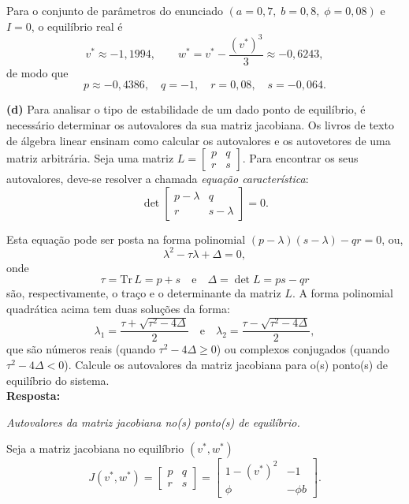 \documentclass[english,11pt,a4paper]{article}
\begin{document}
	\noindent Para o conjunto de parâmetros do enunciado \((a=0{,}7,\; b=0{,}8,\; \phi=0{,}08)\) e \(I=0\), o equilíbrio real é
	\[
	v^\ast \approx -1{,}1994,\qquad w^\ast = v^\ast - \frac{(v^\ast)^3}{3} \approx -0{,}6243,
	\]
	de modo que
	\[
	\boxed{\,p \approx -0{,}4386,\quad q=-1,\quad r=0{,}08,\quad s=-0{,}064.\,}
	\]
	
	
	\noindent\textbf{(d)} Para analisar o tipo de estabilidade de um dado ponto de equilíbrio, é necessário determinar os autovalores da sua matriz jacobiana. Os livros de texto de álgebra linear ensinam como calcular os autovalores e os autovetores de uma matriz arbitrária. Seja uma matriz $L = \begin{bmatrix} p & q \\ r & s \end{bmatrix}$. Para encontrar os seus autovalores, deve-se resolver a chamada \textit{equação característica}:
	\[
	\det
	\begin{bmatrix}
		p - \lambda & q \\
		r & s - \lambda
	\end{bmatrix}
	= 0.
	\]
	
	Esta equação pode ser posta na forma polinomial $(p - \lambda)(s - \lambda) - qr = 0$, ou,
	\[
	\lambda^2 - \tau \lambda + \Delta = 0,
	\]
	onde
	\[
	\tau = \mathrm{Tr}\,L = p + s
	\quad \text{e} \quad
	\Delta = \det L = ps - qr
	\]
	são, respectivamente, o traço e o determinante da matriz $L$. A forma polinomial quadrática acima tem duas soluções da forma:
	\[
	\lambda_1 = \frac{\tau + \sqrt{\tau^2 - 4\Delta}}{2}
	\quad \text{e} \quad
	\lambda_2 = \frac{\tau - \sqrt{\tau^2 - 4\Delta}}{2},
	\]
	que são números reais (quando $\tau^2 - 4\Delta \geq 0$) ou complexos conjugados (quando $\tau^2 - 4\Delta < 0$). Calcule os autovalores da matriz jacobiana para o(s) ponto(s) de equilíbrio do sistema.\\
	
	\noindent\textbf{Resposta:}
	
	\noindent\textit{Autovalores da matriz jacobiana no(s) ponto(s) de equilíbrio.}
	
	\noindent Seja a matriz jacobiana no equilíbrio \((v^\ast,w^\ast)\)
	\[
	J(v^\ast,w^\ast)=
	\begin{bmatrix}
		p & q\\
		r & s
	\end{bmatrix}
	=
	\begin{bmatrix}
		1-(v^\ast)^2 & -1\\
		\phi & -\phi b
	\end{bmatrix}.
	\]
	
\end{document}
